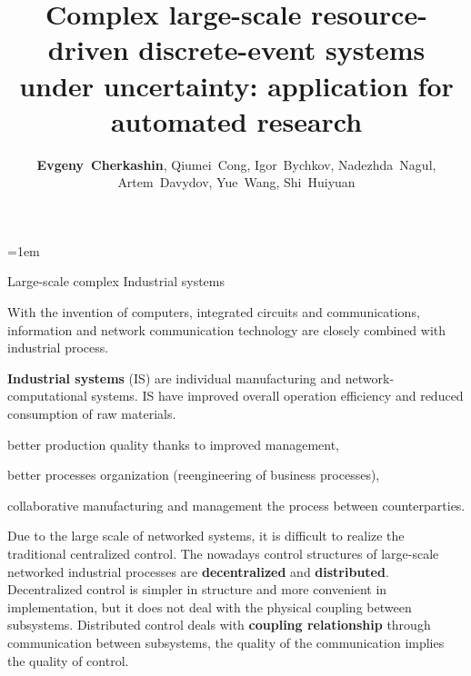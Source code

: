 \documentclass[10pt,dvipsnames]{beamer}
\def\remph#1{\textcolor{Mahogany}{\bfseries #1}}
\begin{document}
\parindent=1em
\title[Complex large-scale DES under uncertainties: application for automated research]{Complex large-scale resource-driven discrete-event systems under uncertainty: application for automated research}
\author{
\def\and{, }
\remph{Evgeny~Cherkashin}\and
Qiumei~Cong\and
Igor~Bychkov\and
Nadezhda~Nagul\and
Artem~Davydov\and
Yue~Wang\and
Shi~Huiyuan}


\maketitle

\begin{frame}{Large-scale complex Industrial systems}

  With the invention of computers, integrated circuits and communications, information and network communication technology are closely combined with industrial process.

  \remph{Industrial systems} (IS) are individual manufacturing and network-computational systems. IS have improved overall operation efficiency and reduced consumption of raw materials.
  \begin{description} \color{MidnightBlue}
  \item[1980] better production quality thanks to improved management,
  \item[1990] better processes organization (reengineering of business processes),
  \item[2000] collaborative manufacturing and management the process between counterparties.
  \end{description}

  Due to the large scale of networked systems, it is difficult to realize the traditional centralized control. The nowadays control structures of large-scale networked industrial processes are \remph{decentralized} and \remph{distributed}.  Decentralized control is simpler in structure and more convenient in implementation, but it does not deal with the physical coupling between subsystems.  Distributed control deals with \remph{coupling relationship} through communication between subsystems, the quality of the communication implies the quality of control.

\end{frame}
\end{document}
